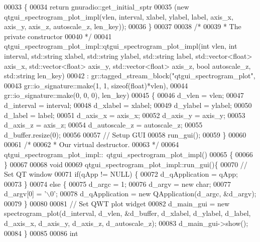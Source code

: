 \begin{DoxyCode}
00033     \{
00034       \textcolor{keywordflow}{return} gnuradio::get\_initial\_sptr
00035         (\textcolor{keyword}{new} qtgui_spectrogram_plot_impl(vlen, interval, xlabel, ylabel, label, axis\_x, axis\_y, axis\_z, 
      autoscale\_z, len\_key));
00036     \}
00037 
00038     \textcolor{comment}{/*}
00039 \textcolor{comment}{     * The private constructor}
00040 \textcolor{comment}{     */}
00041     qtgui_spectrogram_plot_impl::qtgui_spectrogram_plot_impl(\textcolor{keywordtype}{int} vlen, \textcolor{keywordtype}{int} interval, 
      std::string xlabel, std::string ylabel, std::string label, std::vector<float> axis\_x, std::vector<float> 
      axis\_y, std::vector<float> axis\_z, \textcolor{keywordtype}{bool} autoscale\_z, std::string len\_key)
00042       : gr::tagged\_stream\_block(\textcolor{stringliteral}{"qtgui\_spectrogram\_plot"},
00043               gr::io\_signature::make(1, 1, sizeof(float)*vlen),
00044               gr::io\_signature::make(0, 0, 0), len\_key)
00045     \{
00046         d_vlen = vlen;
00047         d_interval = interval;
00048         d_xlabel = xlabel;
00049         d_ylabel = ylabel;
00050         d_label = label;
00051         d_axis_x = axis\_x;
00052         d_axis_y = axis\_y;
00053         d_axis_z = axis\_z;
00054         d_autoscale_z = autoscale\_z;
00055         d_buffer.resize(0);
00056         
00057         \textcolor{comment}{// Setup GUI}
00058         run_gui();
00059     \}
00060 
00061     \textcolor{comment}{/*}
00062 \textcolor{comment}{     * Our virtual destructor.}
00063 \textcolor{comment}{     */}
00064     qtgui_spectrogram_plot_impl::~qtgui_spectrogram_plot_impl()
00065     \{
00066     \}
00067     
00068     \textcolor{keywordtype}{void}
00069     qtgui_spectrogram_plot_impl::run_gui()\{
00070         \textcolor{comment}{// Set QT window}
00071         \textcolor{keywordflow}{if}(qApp != NULL) \{
00072             d_qApplication = qApp;
00073         \}
00074         \textcolor{keywordflow}{else} \{
00075             d_argc = 1;
00076             d_argv = \textcolor{keyword}{new} char;
00077             d_argv[0] = \textcolor{charliteral}{'\(\backslash\)0'};
00078             d_qApplication = \textcolor{keyword}{new} QApplication(d_argc, &d_argv);
00079         \}
00080         
00081         \textcolor{comment}{// Set QWT plot widget}
00082         d_main_gui = \textcolor{keyword}{new} spectrogram_plot(d_interval, d_vlen, &d_buffer, 
      d_xlabel, d_ylabel, d_label, d_axis_x, d_axis_y, d_axis_z, d_autoscale_z);
00083         d_main_gui->show();
00084     \}
00085 
00086     \textcolor{keywordtype}{int}

\end{DoxyCode}
